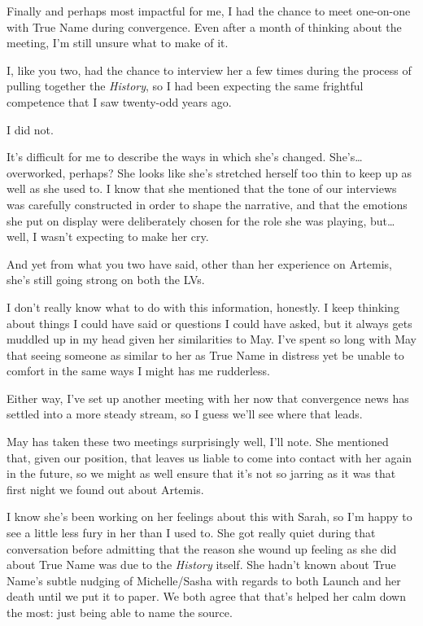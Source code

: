 Finally and perhaps most impactful for me, I had the chance to meet one-on-one with True Name during convergence. Even after a month of thinking about the meeting, I'm still unsure what to make of it.

I, like you two, had the chance to interview her a few times during the process of pulling together the \emph{History}, so I had been expecting the same frightful competence that I saw twenty-odd years ago.

I did not.

It's difficult for me to describe the ways in which she's changed. She's\ldots overworked, perhaps? She looks like she's stretched herself too thin to keep up as well as she used to. I know that she mentioned that the tone of our interviews was carefully constructed in order to shape the narrative, and that the emotions she put on display were deliberately chosen for the role she was playing, but\ldots well, I wasn't expecting to make her cry.

And yet from what you two have said, other than her experience on Artemis, she's still going strong on both the LVs.

I don't really know what to do with this information, honestly. I keep thinking about things I could have said or questions I could have asked, but it always gets muddled up in my head given her similarities to May. I've spent so long with May that seeing someone as similar to her as True Name in distress yet be unable to comfort in the same ways I might has me rudderless.

Either way, I've set up another meeting with her now that convergence news has settled into a more steady stream, so I guess we'll see where that leads.

May has taken these two meetings surprisingly well, I'll note. She mentioned that, given our position, that leaves us liable to come into contact with her again in the future, so we might as well ensure that it's not so jarring as it was that first night we found out about Artemis.

I know she's been working on her feelings about this with Sarah, so I'm happy to see a little less fury in her than I used to. She got really quiet during that conversation before admitting that the reason she wound up feeling as she did about True Name was due to the \emph{History} itself. She hadn't known about True Name's subtle nudging of Michelle/Sasha with regards to both Launch and her death until we put it to paper. We both agree that that's helped her calm down the most: just being able to name the source.

